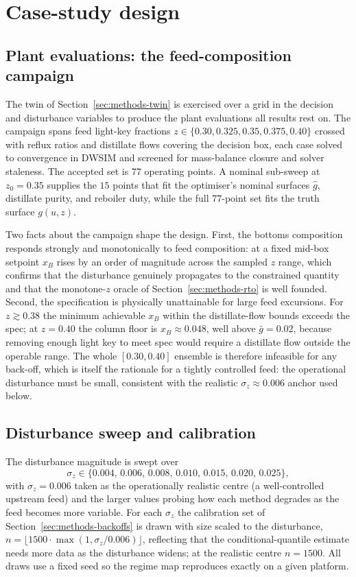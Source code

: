 \section{Case-study design}
\label{sec:case}

\subsection{Plant evaluations: the feed-composition campaign}

The twin of Section~\ref{sec:methods-twin} is exercised over a grid in the decision and
disturbance variables to produce the plant evaluations all results rest on. The campaign
spans feed light-key fractions $z\in\{0.30,0.325,0.35,0.375,0.40\}$ crossed with reflux
ratios and distillate flows covering the decision box, each case solved to convergence in
DWSIM and screened for mass-balance closure and solver staleness. The accepted set is $77$
operating points. A nominal sub-sweep at $z_0=0.35$ supplies the $15$ points that fit the
optimiser's nominal surfaces $\hat g$, distillate purity, and reboiler duty, while the full
$77$-point set fits the truth surface $g(u,z)$.

Two facts about the campaign shape the design. First, the bottoms composition responds
strongly and monotonically to feed composition: at a fixed mid-box setpoint $x_B$ rises by an
order of magnitude across the sampled $z$ range, which confirms that the disturbance genuinely
propagates to the constrained quantity and that the monotone-$z$ oracle of
Section~\ref{sec:methods-rto} is well founded. Second, the specification is physically
unattainable for large feed excursions. For $z\gtrsim0.38$ the minimum achievable $x_B$ within
the distillate-flow bounds exceeds the spec; at $z=0.40$ the column floor is $x_B\approx0.048$,
well above $\bar g=0.02$, because removing enough light key to meet spec would require a
distillate flow outside the operable range. The whole $[0.30,0.40]$ ensemble is therefore
infeasible for any back-off, which is itself the rationale for a tightly controlled feed: the
operational disturbance must be small, consistent with the realistic $\sigma_z\approx0.006$
anchor used below.

\subsection{Disturbance sweep and calibration}

The disturbance magnitude is swept over
\[
\sigma_z\in\{0.004,\,0.006,\,0.008,\,0.010,\,0.015,\,0.020,\,0.025\},
\]
with $\sigma_z=0.006$ taken as the
operationally realistic centre (a well-controlled upstream feed) and the larger values probing
how each method degrades as the feed becomes more variable. For each $\sigma_z$ the calibration
set of Section~\ref{sec:methods-backoffs} is drawn with size scaled to the disturbance,
$n=\lfloor 1500\cdot\max(1,\sigma_z/0.006)\rfloor$, reflecting that the conditional-quantile
estimate needs more data as the disturbance widens; at the realistic centre $n=1500$. All
draws use a fixed seed so the regime map reproduces exactly on a given platform.

